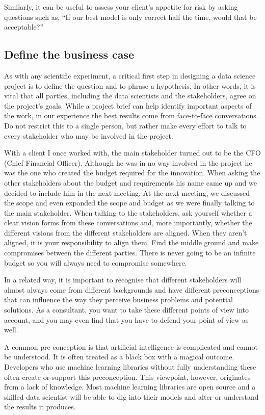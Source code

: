 \documentclass[]{book}
\begin{document}
Similarly, it can be useful to assess your client's appetite for risk by
asking questions such as, ``If our best model is only correct half the
time, would that be acceptable?''

\hypertarget{define-the-business-case}{%
\subsection{Define the business case}\label{define-the-business-case}}

As with any scientific experiment, a critical first step in designing a
data science project is to define the question and to phrase a
hypothesis. In other words, it is vital that all parties, including the
data scientists and the stakeholders, agree on the project's goals.
While a project brief can help identify important aspects of the work,
in our experience the best results come from face-to-face conversations.
Do not restrict this to a single person, but rather make every effort to
talk to every stakeholder who may be involved in the project.

With a client I once worked with, the main stakeholder turned out to be
the CFO (Chief Financial Officer). Although he was in no way involved in
the project he was the one who created the budget required for the
innovation. When asking the other stakeholders about the budget and
requirements his name came up and we decided to include him in the next
meeting. At the next meeting, we discussed the scope and even expanded
the scope and budget as we were finally talking to the main stakeholder.
When talking to the stakeholders, ask yourself whether a clear vision
forms from these conversations and, more importantly, whether the
different visions from the different stakeholders are aligned. When they
aren't aligned, it is your responsibility to align them. Find the middle
ground and make compromises between the different parties. There is
never going to be an infinite budget so you will always need to
compromise somewhere.

In a related way, it is important to recognise that different
stakeholders will almost always come from different backgrounds and have
different preconceptions that can influence the way they perceive
business problems and potential solutions. As a consultant, you want to
take these different points of view into account, and you may even find
that you have to defend your point of view as well.

A common pre-conception is that artificial intelligence is complicated
and cannot be understood. It is often treated as a black box with a
magical outcome. Developers who use machine learning libraries without
fully understanding these often create or support this preconception.
This viewpoint, however, originates from a lack of knowledge. Most
machine learning libraries are open source and a skilled data scientist
will be able to dig into their models and alter or understand the
results it produces.
\end{document}
